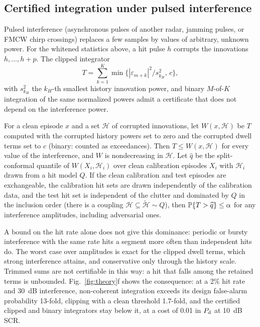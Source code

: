 \subsection{Certified integration under pulsed interference}
Pulsed interference (asynchronous pulses of another radar, jamming pulses, or FMCW chirp crossings) replaces a few samples by values of arbitrary, unknown power. For the whitened statistics above, a hit pulse $h$ corrupts the innovations $h,\dots,h+p$. The clipped integrator \cite{abbasi2018clip}
\[
T=\sum_{k=1}^{K}\min\{|\varepsilon_{m+k}|^2/s_{k_H}^2,\,c\},
\]
with $s_{k_H}^2$ the $k_H$-th smallest history innovation power, and binary $M$-of-$K$ integration of the same normalized powers admit a certificate that does not depend on the interference power.
\begin{theorem}\label{thm:cert}
For a clean episode $x$ and a set $\mathcal H$ of corrupted innovations, let $W(x,\mathcal H)$ be $T$ computed with the corrupted history powers set to zero and the corrupted dwell terms set to $c$ (binary: counted as exceedances). Then $T\le W(x,\mathcal H)$ for every value of the interference, and $W$ is nondecreasing in $\mathcal H$. Let $\widehat q$ be the split-conformal quantile of $W(X_i,\mathcal H_i)$ over clean calibration episodes $X_i$ with $\mathcal H_i$ drawn from a hit model $Q$. If the clean calibration and test episodes are exchangeable, the calibration hit sets are drawn independently of the calibration data, and the test hit set is independent of the clutter and dominated by $Q$ in the inclusion order (there is a coupling $\mathcal H\subseteq\tilde{\mathcal H}\sim Q$), then $\mathbb{P}\{T>\widehat q\}\le\alpha$ for any interference amplitudes, including adversarial ones.
\end{theorem}
A bound on the hit rate alone does not give this dominance: periodic or bursty interference with the same rate hits a segment more often than independent hits do. The worst case over amplitudes is exact for the clipped dwell terms, which strong interference attains, and conservative only through the history scale. Trimmed sums are not certifiable in this way: a hit that falls among the retained terms is unbounded. Fig.~\ref{fig:theory}f shows the consequence: at a 2\% hit rate and 30~dB interference, non-coherent integration exceeds its design false-alarm probability 13-fold, clipping with a clean threshold 1.7-fold, and the certified clipped and binary integrators stay below it, at a cost of 0.01 in $P_{\rm d}$ at 10~dB SCR.

